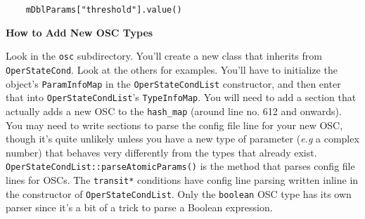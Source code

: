 \documentclass[11pt]{article}
\begin{document}
\begin{verbatim}
    mDblParams["threshold"].value()
\end{verbatim}

\begin{center}
  \textbf{How to Add New OSC Types}
\end{center}

Look in the \texttt{osc} subdirectory.  You'll create a new class that
inherits from \texttt{OperStateCond}.  Look at the others for
examples.  You'll have to initialize the object's
\texttt{ParamInfoMap} in the \texttt{OperStateCondList} constructor,
and then enter that into \texttt{OperStateCondList}'s
\texttt{TypeInfoMap}.  You will need to add a section that actually
adds a new OSC to the \texttt{hash\_map} (around line no. 612 and
onwards).  You may need to write sections to parse the config file
line for your new OSC, though it's quite unlikely unless you have a
new type of parameter (\textit{e.g} a complex number) that behaves
very differently from the types that already exist.
\texttt{OperStateCondList::parseAtomicParams()} is the method that
parses config file lines for OSCs.  The \texttt{transit*} conditions
have config line parsing written inline in the constructor of
\texttt{OperStateCondList}.  Only the \texttt{boolean} OSC type has
its own parser since it's a bit of a trick to parse a Boolean
expression.
\end{document}
